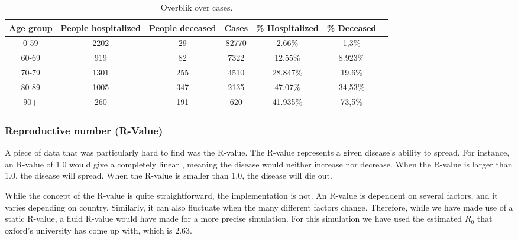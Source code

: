 \begin{table}[H]
	\centering
	\begin{tabular}{ccccccc}	%
		\toprule
		Age group & People hospitalized & People deceased & Cases & \% Hospitalized & \% Deceased \\\midrule
		0-59 & 2202 & 29 & 82770 & 2.66\% & 1,3\%           \\
		60-69 & 919 & 82  & 7322 & 12.55\% & 8.923\%           \\
		70-79 & 1301 & 255 & 4510 & 28.847\% & 19.6\%           \\
		80-89 & 1005 & 347 & 2135 & 47.07\%  & 34,53\%         \\
		90+ & 260 & 191 & 620 & 41.935\% & 73,5\%         \\
		\bottomrule
	\end{tabular}
	\caption{Overblik over cases.}
	\label{tab:cases}
\end{table}


\subsubsection{Reproductive number (R-Value)}
A piece of data that was particularly hard to find was the R-value. The R-value represents a given disease's ability to spread. For instance, an R-value of 1.0 would give a completely linear , meaning the disease would neither increase nor decrease. When the R-value is larger than 1.0, the disease will spread. When the R-value is smaller than 1.0, the disease will die out.

While the concept of the R-value is quite straightforward, the implementation is not. An R-value is dependent on several factors, and it varies depending on country. Similarly, it can also fluctuate when the many different factors change. Therefore, while we have made use of a static R-value, a fluid R-value would have made for a more precise simulation. For this simulation we have used the estimated $R_0$ that oxford's university has come up with, which is 2.63.
 \citep{mahase_covid-19_2020}

